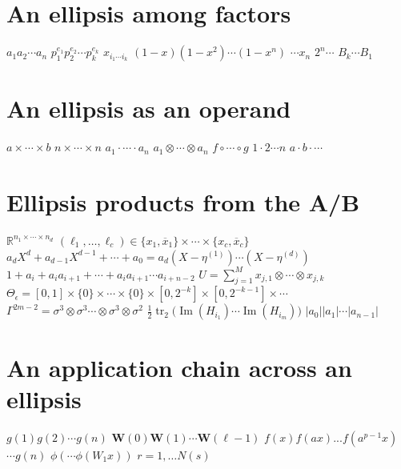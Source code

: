 \documentclass{article}
\begin{document}
\section{An ellipsis among factors}
$a_1a_2\cdots a_n$ $p_1^{e_1}p_2^{e_2}\cdots p_k^{e_k}$ $x_{i_1\cdots i_k}$ $(1-x)(1-x^2)\cdots(1-x^n)$
$\cdots x_n$ $2^{n}\cdots$ $B_{k}\cdots B_{1}$

\section{An ellipsis as an operand}
$a\times\cdots\times b$ $n\times\cdots\times n$ $a_1\cdot\cdots\cdot a_n$ $a_1\otimes\cdots\otimes a_n$ $f\circ\cdots\circ g$
$1\cdot 2\cdots n$ $a\cdot b\cdot\cdots$

\section{Ellipsis products from the A/B}
$\mathbb{R}^{n_{1}\times\cdots\times n_{d}}$ $(\ell_{1},\ldots,\ell_{c})\in\{x_{1},\overline{x}_{1}\}\times\cdots\times\{x_{c},\overline{x}_{c}\}$
$a_{d}X^{d}+a_{d-1}X^{d-1}+\cdots+a_{0}=a_{d}(X-\eta^{(1)})\cdots(X-\eta^{(d)})$ $1+a_{i}+a_{i}a_{i+1}+\cdots+a_{i}a_{i+1}\cdots a_{i+n-2}$
$U=\sum_{j=1}^{M}x_{j,1}\otimes\cdots\otimes x_{j,k}$ $\Theta_{\epsilon}=[0,1]\times\{0\}\times\cdots\times\{0\}\times[0,2^{-k}]\times[0,2^{-k-1}]\times\cdots$
$\Gamma^{2m-2}=\sigma^{3}\otimes\sigma^{3}\cdots\otimes\sigma^{3}\otimes\sigma^{2}$ $\frac{1}{2}\operatorname{tr}_{2}\big(\operatorname{Im}(H_{i_{1}})\cdots\operatorname{Im}(H_{i_{m}})\big)$
$|a_{0}||a_{1}|\cdots|a_{n-1}|$

\section{An application chain across an ellipsis}
$g(1)g(2)\cdots g(n)$ $\mathbf{W}(0)\mathbf{W}(1)\cdots\mathbf{W}(\ell-1)$ $f(x)f(ax)...f(a^{p-1}x)$ $\cdots g(n)$
$\phi(\cdots\phi(W_1x))$ $r=1,\ldots N(s)$
\end{document}
